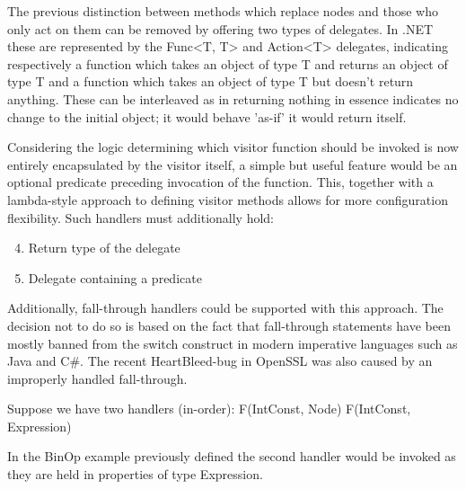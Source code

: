 \documentclass[twoside,openright]{uva-bachelor-thesis}
\begin{document}
			The previous distinction between methods which replace nodes and those who only act on them can be removed by offering two types of delegates. In .NET these are represented by the Func<T, T> and Action<T>  delegates, indicating respectively a function which takes an object of type T and returns an object of type T and a function which takes an object of type T but doesn't return anything. These can be interleaved as in returning nothing in essence indicates no change to the initial object; it would behave 'as-if' it would return itself.
			
			Considering the logic determining which visitor function should be invoked is now entirely encapsulated by the visitor itself, a simple but useful feature would be an optional predicate preceding invocation of the function. This, together with a lambda-style approach to defining visitor methods allows for more configuration flexibility. Such handlers must additionally hold:
			\begin{enumerate}
				\setcounter{enumi}{3}
				\item Return type of the delegate
				\item Delegate containing a predicate
			\end{enumerate}
			
			
			Additionally, fall-through handlers could be supported with this approach. The decision not to do so is based on the fact that fall-through statements have been mostly banned from the switch construct in modern imperative languages such as Java and C\#. The recent HeartBleed-bug in OpenSSL was also caused by an improperly handled fall-through.
			
			Suppose we have two handlers (in-order):
			F(IntConst, Node)
			F(IntConst, Expression)
			
			In the BinOp example previously defined the second handler would be invoked as they are held in properties of type Expression. 
			
\end{document}
